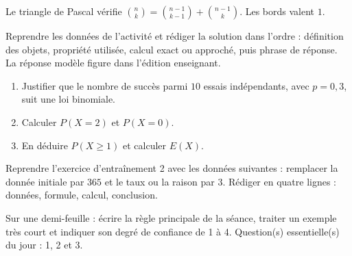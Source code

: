 \begin{traceecrite}Le triangle de Pascal vérifie $\binom nk=\binom{n-1}{k-1}+\binom{n-1}{k}$. Les bords valent $1$.\end{traceecrite}

\begin{exemple}
Reprendre les données de l'activité et rédiger la solution dans l'ordre : définition des objets, propriété utilisée, calcul exact ou approché, puis phrase de réponse. La réponse modèle figure dans l'édition enseignant.
\end{exemple}

\begin{exercice}[-- essentiel]
\begin{enumerate}\item Justifier que le nombre de succès parmi $10$ essais indépendants, avec $p=0{,}3$, suit une loi binomiale.\item Calculer $P(X=2)$ et $P(X=0)$.\item En déduire $P(X\geq1)$ et calculer $E(X)$.\end{enumerate}
\end{exercice}


\begin{dm}Reprendre l'exercice d'entraînement 2 avec les données suivantes : remplacer la donnée initiale par $365$ et le taux ou la raison par $3$. Rédiger en quatre lignes : données, formule, calcul, conclusion.\end{dm}

\begin{sortie}Sur une demi-feuille : écrire la règle principale de la séance, traiter un exemple très court et indiquer son degré de confiance de 1 à 4. Question(s) essentielle(s) du jour : 1, 2 et 3.\end{sortie}

